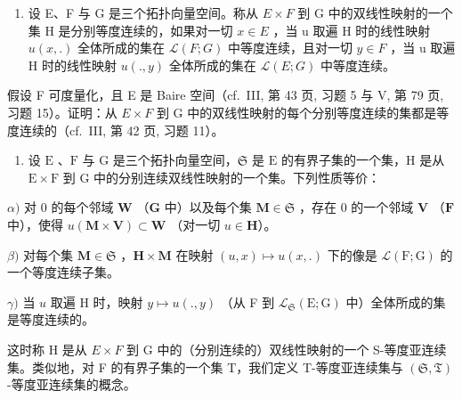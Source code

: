 \begin{enumerate}
\def\labelenumi{\arabic{enumi})}
\setcounter{enumi}{5}
\tightlist
\item
  设 E、F 与 G 是三个拓扑向量空间。称从 \(E \times F\) 到 G 中的双线性映射的一个集 H 是分别等度连续的，如果对一切 \(x \in E\) ，当 u 取遍 H 时的线性映射 \(u(x, .)\) 全体所成的集在 \(\mathcal{L}(F; G)\) 中等度连续，且对一切 \(y \in F\) ，当 u 取遍 H 时的线性映射 \(u(. , y)\) 全体所成的集在 \(\mathcal{L}(E; G)\) 中等度连续。
\end{enumerate}

假设 F 可度量化，且 E 是 Baire 空间（cf.~III, 第 43 页, 习题 5 与 V, 第 79 页, 习题 15）。证明：从 \(E \times F\) 到 G 中的双线性映射的每个分别等度连续的集都是等度连续的（cf.~III, 第 42 页, 习题 11）。

\begin{enumerate}
\def\labelenumi{\arabic{enumi})}
\setcounter{enumi}{6}
\tightlist
\item
  设 \(\mathrm{E}\) 、\(\mathrm{F}\) 与 \(\mathrm{G}\) 是三个拓扑向量空间，\(\mathfrak{S}\) 是 \(\mathrm{E}\) 的有界子集的一个集，\(\mathrm{H}\) 是从 \(\mathrm{E} \times \mathrm{F}\) 到 \(\mathrm{G}\) 中的分别连续双线性映射的一个集。下列性质等价：
\end{enumerate}

\(\alpha)\) 对 0 的每个邻域 \(\mathbf{W}\) （\(\mathbf{G}\) 中）以及每个集 \(\mathbf{M} \in \mathfrak{S}\) ，存在 0 的一个邻域 \(\mathbf{V}\) （\(\mathbf{F}\) 中），使得 \(u(\mathbf{M} \times \mathbf{V}) \subset \mathbf{W}\) （对一切 \(u \in \mathbf{H}\)）。

\(\beta)\) 对每个集 \(\mathbf{M} \in \mathfrak{S}\) ，\(\mathbf{H} \times \mathbf{M}\) 在映射 \((u, x) \mapsto u(x, .)\) 下的像是 \(\mathcal{L}(\mathrm{F}; \mathrm{G})\) 的一个等度连续子集。

\(\gamma)\) 当 \(u\) 取遍 H 时，映射 \(y \mapsto u(., y)\) （从 F 到 \(\mathcal{L}_{\mathfrak{S}}(\mathrm{E}; \mathrm{G})\) 中）全体所成的集是等度连续的。

这时称 H 是从 \(E \times F\) 到 G 中的（分别连续的）双线性映射的一个 S-等度亚连续集。类似地，对 F 的有界子集的一个集 T，我们定义 T-等度亚连续集与 \((\mathfrak{S}, \mathfrak{T})\) -等度亚连续集的概念。

